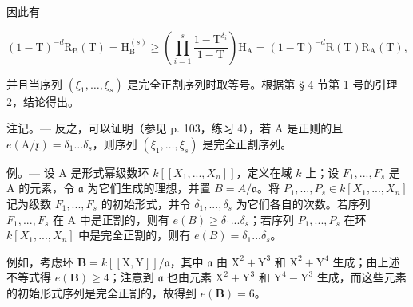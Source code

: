 因此有

\[
(1 - \mathrm{T}) ^ {- d} \mathrm{R} _ {\mathrm{B}} (\mathrm{T}) = \mathrm{H} _ {\mathrm{B}} ^ {(s)} \geqslant \left(\prod_ {i = 1} ^ {s} \frac {1 - \mathrm{T} ^ {\delta_ {i}}}{1 - \mathrm{T}}\right) \mathrm{H} _ {\mathrm{A}} = (1 - \mathrm{T}) ^ {- d} \mathrm{R} (\mathrm{T}) \mathrm{R} _ {\mathrm{A}} (\mathrm{T}),
\]

并且当序列 \((\xi_{1},\ldots,\xi_{s})\) 是完全正割序列时取等号。根据第 § 4 节第 1 号的引理 2，结论得出。

注记。--- 反之，可以证明（参见 p. 103，练习 4），若 A 是正则的且 \(e(\mathrm{A}/\mathfrak{x})=\delta_{1}\ldots\delta_{s}\)，则序列 \((\xi_{1},\ldots,\xi_{s})\) 是完全正割序列。

例。--- 设 A 是形式幂级数环 \(k[[X_1, ..., X_n]]\)，定义在域 \(k\) 上；设 \(F_1, ..., F_s\) 是 A 的元素，令 \(\mathfrak{a}\) 为它们生成的理想，并置 \(B = A/\mathfrak{a}\)。将 \(P_1, ..., P_s \in k[X_1, ..., X_n]\) 记为级数 \(F_1, ..., F_s\) 的初始形式，并令 \(\delta_1, ..., \delta_s\) 为它们各自的次数。若序列 \(F_1, ..., F_s\) 在 A 中是正割的，则有 \(e(B) \geqslant \delta_1 ... \delta_s\)；若序列 \(P_1, ..., P_s\) 在环 \(k[X_1, ..., X_n]\) 中是完全正割的，则有 \(e(B) = \delta_1 ... \delta_s\)。

例如，考虑环 \(\mathbf{B} = k[[\mathrm{X},\mathrm{Y}]] / \mathfrak{a}\)，其中 \(\mathfrak{a}\) 由 \(\mathrm{X}^2 + \mathrm{Y}^3\) 和 \(\mathrm{X}^2 + \mathrm{Y}^4\) 生成；由上述不等式得 \(e(\mathbf{B})\geqslant 4\)；注意到 \(\mathfrak{a}\) 也由元素 \(\mathrm{X}^2 + \mathrm{Y}^3\) 和 \(\mathrm{Y}^4 -\mathrm{Y}^3\) 生成，而这些元素的初始形式序列是完全正割的，故得到 \(e(\mathbf{B}) = 6\)。
\relax{}
